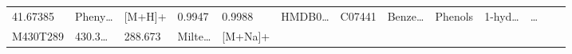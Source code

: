 \documentclass[
]{article}
\begin{document}
\begin{longtable}[]{@{}lllllllllllll@{}}
\begin{minipage}[t]{0.05\columnwidth}
41.67385\strut
\end{minipage} & \begin{minipage}[t]{0.05\columnwidth}\raggedright
Pheny\ldots{}\strut
\end{minipage} & \begin{minipage}[t]{0.05\columnwidth}\raggedright
{[}M+H{]}+\strut
\end{minipage} & \begin{minipage}[t]{0.07\columnwidth}\raggedright
0.9947\strut
\end{minipage} & \begin{minipage}[t]{0.07\columnwidth}\raggedright
0.9988\strut
\end{minipage} & \begin{minipage}[t]{0.05\columnwidth}\raggedright
HMDB0\ldots{}\strut
\end{minipage} & \begin{minipage}[t]{0.04\columnwidth}\raggedright
C07441\strut
\end{minipage} & \begin{minipage}[t]{0.05\columnwidth}\raggedright
Benze\ldots{}\strut
\end{minipage} & \begin{minipage}[t]{0.05\columnwidth}\raggedright
Phenols\strut
\end{minipage} & \begin{minipage}[t]{0.05\columnwidth}\raggedright
1-hyd\ldots{}\strut
\end{minipage} & \begin{minipage}[t]{0.02\columnwidth}\raggedright
\ldots{}\strut
\end{minipage}\tabularnewline
\begin{minipage}[t]{0.05\columnwidth}\raggedright
M430T289\strut
\end{minipage} & \begin{minipage}[t]{0.05\columnwidth}\raggedright
430.3\ldots{}\strut
\end{minipage} & \begin{minipage}[t]{0.05\columnwidth}\raggedright
288.673\strut
\end{minipage} & \begin{minipage}[t]{0.05\columnwidth}\raggedright
Milte\ldots{}\strut
\end{minipage} & \begin{minipage}[t]{0.05\columnwidth}\raggedright
{[}M+Na{]}+\strut
\end{minipage} & \begin{minipage}[t]{0.07\columnwidth}\raggedright

\end{minipage}
\end{longtable}
\end{document}
